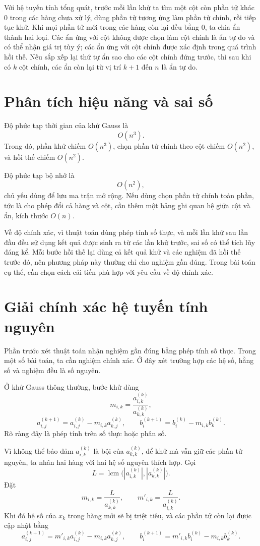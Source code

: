 \documentclass[11pt]{article}
\begin{document}
Với hệ tuyến tính tổng quát, trước mỗi lần khử ta tìm một cột còn phần tử khác
\(0\) trong các hàng chưa xử lý, dùng phần tử tương ứng làm phần tử chính, rồi
tiếp tục khử. Khi mọi phần tử mới trong các hàng còn lại đều bằng \(0\), ta
chia ẩn thành hai loại. Các ẩn ứng với cột không được chọn làm cột chính là ẩn
tự do và có thể nhận giá trị tùy ý; các ẩn ứng với cột chính được xác định
trong quá trình hồi thế. Nếu sắp xếp lại thứ tự ẩn sao cho các cột chính đứng
trước, thì sau khi có \(k\) cột chính, các ẩn còn lại từ vị trí \(k+1\) đến
\(n\) là ẩn tự do.

\section{Phân tích hiệu năng và sai số}

Độ phức tạp thời gian của khử Gauss là
\[
  O(n^3).
\]
Trong đó, phần khử chiếm \(O(n^3)\), chọn phần tử chính theo cột chiếm
\(O(n^2)\), và hồi thế chiếm \(O(n^2)\).

Độ phức tạp bộ nhớ là
\[
  O(n^2),
\]
chủ yếu dùng để lưu ma trận mở rộng. Nếu dùng chọn phần tử chính toàn phần,
tức là cho phép đổi cả hàng và cột, cần thêm một bảng ghi quan hệ giữa cột và
ẩn, kích thước \(O(n)\).

Về độ chính xác, vì thuật toán dùng phép tính số thực, và mỗi lần khử sau lần
đầu đều sử dụng kết quả được sinh ra từ các lần khử trước, sai số có thể tích
lũy đáng kể. Mỗi bước hồi thế lại dùng cả kết quả khử và các nghiệm đã hồi
thế trước đó, nên phương pháp này thường chỉ cho nghiệm gần đúng. Trong bài
toán cụ thể, cần chọn cách cải tiến phù hợp với yêu cầu về độ chính xác.

\section{Giải chính xác hệ tuyến tính nguyên}

Phần trước xét thuật toán nhận nghiệm gần đúng bằng phép tính số thực. Trong
một số bài toán, ta cần nghiệm chính xác. Ở đây xét trường hợp các hệ số, hằng
số và nghiệm đều là số nguyên.

Ở khử Gauss thông thường, bước khử dùng
\[
  m_{i,k}=\frac{a_{i,k}^{(k)}}{a_{k,k}^{(k)}},
\]
\[
  a_{i,j}^{(k+1)}=a_{i,j}^{(k)}-m_{i,k}a_{k,j}^{(k)},
  \qquad
  b_i^{(k+1)}=b_i^{(k)}-m_{i,k}b_k^{(k)}.
\]
Rõ ràng đây là phép tính trên số thực hoặc phân số.

Vì không thể bảo đảm \(a_{i,k}^{(k)}\) là bội của \(a_{k,k}^{(k)}\), để khử
mà vẫn giữ các phần tử nguyên, ta nhân hai hàng với hai hệ số nguyên thích
hợp. Gọi
\[
  L=\operatorname{lcm}\bigl(|a_{i,k}^{(k)}|,|a_{k,k}^{(k)}|\bigr).
\]
Đặt
\[
  m_{i,k}=\frac{L}{a_{k,k}^{(k)}},
  \qquad
  m'_{i,k}=\frac{L}{a_{i,k}^{(k)}}.
\]
Khi đó hệ số của \(x_k\) trong hàng mới sẽ bị triệt tiêu, và các phần tử còn
lại được cập nhật bằng
\[
  a_{i,j}^{(k+1)}
  =m'_{i,k}a_{i,j}^{(k)}-m_{i,k}a_{k,j}^{(k)},
  \qquad
  b_i^{(k+1)}
  =m'_{i,k}b_i^{(k)}-m_{i,k}b_k^{(k)}.
\]
\end{document}

